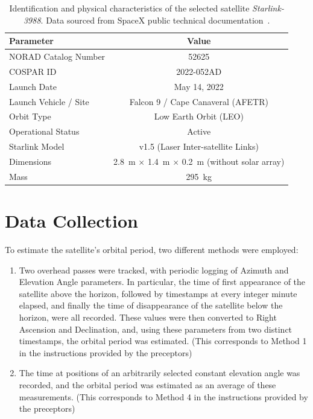 \documentclass{article}
\begin{document}
\begin{table}[h]
    \centering
    \caption{Identification and physical characteristics of the selected satellite \textit{Starlink-3988}. Data sourced from SpaceX public technical documentation~\cite{spacex_starlink_specs}.}
    \label{tab:starlink3988_params}
    \begin{tabular}{|l|c|}
        \hline
        \textbf{Parameter} & \textbf{Value} \\ \hline
        NORAD Catalog Number & 52625 \\ \hline
        COSPAR ID & 2022-052AD \\ \hline
        Launch Date & May 14, 2022 \\ \hline
        Launch Vehicle / Site & Falcon 9 / Cape Canaveral (AFETR) \\ \hline
        Orbit Type & Low Earth Orbit (LEO) \\ \hline
        Operational Status & Active \\ \hline
        Starlink Model & v1.5 (Laser Inter-satellite Links) \\ \hline
        Dimensions & \SI{2.8}{\metre} $\times$ \SI{1.4}{\metre} $\times$ \SI{0.2}{\metre} (without solar array) \\ \hline
        Mass & 295~\si{\kilogram} \\ \hline
    \end{tabular}
\end{table}

\newpage
\section{Data Collection} \label{sec:data}

To estimate the satellite's orbital period, two different methods were employed:

\begin{enumerate}
    \item Two overhead passes were tracked, with periodic logging of Azimuth and Elevation Angle parameters. In particular, the time of first appearance of the satellite above the horizon, followed by timestamps at every integer minute elapsed, and finally the time of disappearance of the satellite below the horizon, were all recorded. These values were then converted to Right Ascension and Declination, and, using these parameters from two distinct timestamps, the orbital period was estimated. (This corresponds to Method 1 in the instructions provided by the preceptors)
    \item The time at positions of an arbitrarily selected constant elevation angle was recorded, and the orbital period was estimated as an average of these measurements. (This corresponds to Method 4 in the instructions provided by the preceptors)
\end{enumerate}
\end{document}
